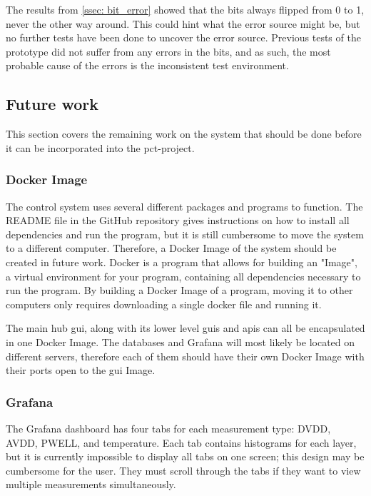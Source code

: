 \documentclass[main.tex]{subfiles}
\begin{document}
The results from \autoref{ssec: bit_error} showed that the bits always flipped from 0 to 1, never the other way around. This could hint what the error source might be, but no further tests have been done to uncover the error source. Previous tests of the prototype did not suffer from any errors in the bits, and as such, the most probable cause of the errors is the inconsistent test environment.

\subsection{Future work}

This section covers the remaining work on the system that should be done before it can be incorporated into the \gls{pct}-project.


\subsubsection{Docker Image}
 
 The control system uses several different packages and programs to function. The README file in the GitHub repository gives instructions on how to install all dependencies and run the program, but it is still cumbersome to move the system to a different computer. Therefore, a Docker Image of the system should be created in future work. Docker is a program that allows for building an "Image", a virtual environment for your program, containing all dependencies necessary to run the program. By building a Docker Image of a program, moving it to other computers only requires downloading a single docker file and running it.
 
 The main hub \gls{gui}, along with its lower level \gls{gui}s and \gls{api}s can all be encapsulated in one Docker Image. The databases and Grafana will most likely be located on different servers, therefore each of them should have their own Docker Image with their ports open to the \gls{gui} Image.

\subsubsection{Grafana}

The Grafana dashboard has four tabs for each measurement type: DVDD, AVDD, PWELL, and temperature. Each tab contains histograms for each layer, but it is currently impossible to display all tabs on one screen; this design may be cumbersome for the user. They must scroll through the tabs if they want to view multiple measurements simultaneously.
\end{document}
